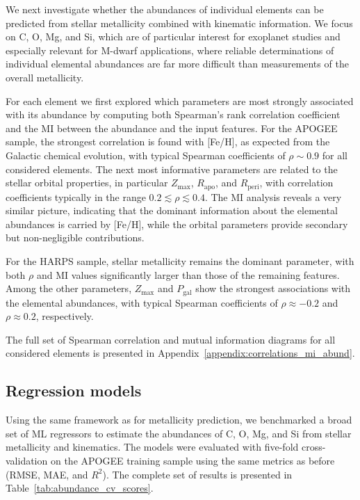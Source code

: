 \documentclass{aa}
\begin{document}
We next investigate whether the abundances of individual elements can be predicted from stellar metallicity combined with kinematic information. We focus on C, O, Mg, and Si, which are of particular interest for exoplanet studies and especially relevant for M-dwarf applications, where reliable determinations of individual elemental abundances are far more difficult than measurements of the overall metallicity.

For each element we first explored which parameters are most strongly associated with its abundance by computing both Spearman's rank correlation coefficient and the MI between the abundance and the input features. For the APOGEE sample, the strongest correlation is found with [Fe/H], as expected from the Galactic chemical evolution, with typical Spearman coefficients of $\rho \sim 0.9$ for all considered elements. The next most informative parameters are related to the stellar orbital properties, in particular $Z_{\max}$, $R_{\mathrm{apo}}$, and $R_{\mathrm{peri}}$, with correlation coefficients typically in the range $0.2 \lesssim \rho \lesssim 0.4$. The MI analysis reveals a very similar picture, indicating that the dominant information about the elemental abundances is carried by [Fe/H], while the orbital parameters provide secondary but non-negligible contributions.

For the HARPS sample, stellar metallicity remains the dominant parameter, with both $\rho$ and MI values significantly larger than those of the remaining features. Among the other parameters, $Z_{\max}$ and $P_{\mathrm{gal}}$ show the strongest associations with the elemental abundances, with typical Spearman coefficients of $\rho \approx -0.2$ and $\rho \approx 0.2$, respectively.

The full set of Spearman correlation and mutual information diagrams for all considered elements is presented in Appendix~\ref{appendix:correlations_mi_abund}.


\subsection{Regression models}

Using the same framework as for metallicity prediction, we benchmarked a broad set of ML regressors to estimate the abundances of C, O, Mg, and Si from stellar metallicity and kinematics. The models were evaluated with five-fold cross-validation on the APOGEE training sample using the same metrics as before (RMSE, MAE, and $R^2$). The complete set of results is presented in Table~\ref{tab:abundance_cv_scores}.
\end{document}
